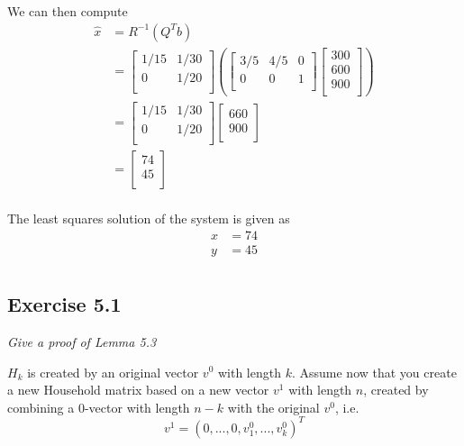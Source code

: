 We can then compute
\begin{align*}
    \hat{x} &= R^{-1} (Q^T b) \\
    &= \begin{bmatrix}
        1/15 & 1/30 \\ 0 & 1/20 \\
    \end{bmatrix} \left(
    \begin{bmatrix}
        3/5 & 4/5 & 0 \\
        0 & 0 & 1 \\
    \end{bmatrix}
    \begin{bmatrix}
        300 \\ 600 \\ 900 \\
    \end{bmatrix}
    \right) \\
    &= \begin{bmatrix}
        1/15 & 1/30 \\ 0 & 1/20 \\
    \end{bmatrix}
    \begin{bmatrix}
        660 \\ 900 \\
    \end{bmatrix} \\
    &= \begin{bmatrix}
        74 \\ 45 \\
    \end{bmatrix} \\
\end{align*}

The least squares solution of the system is given as
\begin{align*}
    x &= 74 \\
    y &= 45 \\
\end{align*}



\subsection{Exercise 5.1}
\textit{Give a proof of Lemma 5.3}

$H_k$ is created by an original vector $v^0$ with length $k$. Assume now that you create a new Household matrix based on a new vector $v^1$ with length $n$, created by combining a 0-vector with length $n - k$ with the original $v^0$, i.e.
\begin{equation*}
    v^1 = (0, ..., 0, v^0_1, ..., v^0_k)^T
\end{equation*}

